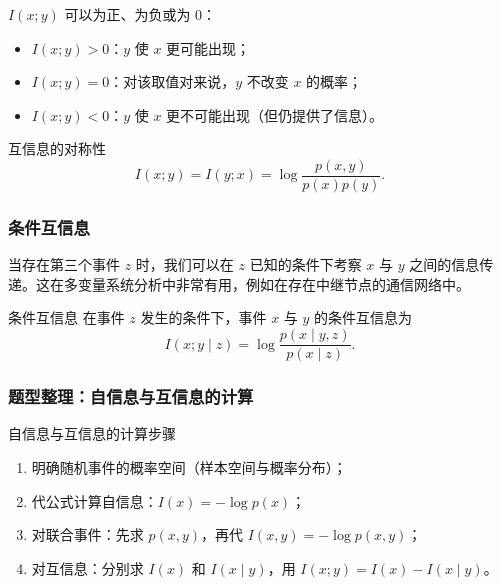 $I(x;y)$ 可以为正、为负或为 0：
\begin{itemize}
  \item $I(x;y) > 0$：$y$ 使 $x$ 更可能出现；
  \item $I(x;y) = 0$：对该取值对来说，$y$ 不改变 $x$ 的概率；
  \item $I(x;y) < 0$：$y$ 使 $x$ 更不可能出现（但仍提供了信息）。
\end{itemize}

\begin{formulaBox}{互信息的对称性}
\[
I(x;y) = I(y;x) = \log \frac{p(x,y)}{p(x)p(y)}.
\]
\end{formulaBox}

\subsubsection{条件互信息}
当存在第三个事件 $z$ 时，我们可以在 $z$ 已知的条件下考察 $x$ 与 $y$ 之间的信息传递。这在多变量系统分析中非常有用，例如在存在中继节点的通信网络中。

\begin{definitionBox}{条件互信息}
在事件 $z$ 发生的条件下，事件 $x$ 与 $y$ 的条件互信息为
\[
I(x;y \mid z) = \log \frac{p(x \mid y,z)}{p(x \mid z)}.
\]
\end{definitionBox}

\subsubsection{题型整理：自信息与互信息的计算}

\begin{methodBox}{自信息与互信息的计算步骤}
\begin{enumerate}
  \item 明确随机事件的概率空间（样本空间与概率分布）；
  \item 代公式计算自信息：$I(x)=-\log p(x)$；
  \item 对联合事件：先求 $p(x,y)$，再代 $I(x,y)=-\log p(x,y)$；
  \item 对互信息：分别求 $I(x)$ 和 $I(x \mid y)$，用 $I(x;y)=I(x)-I(x \mid y)$。
\end{enumerate}
\end{methodBox}

